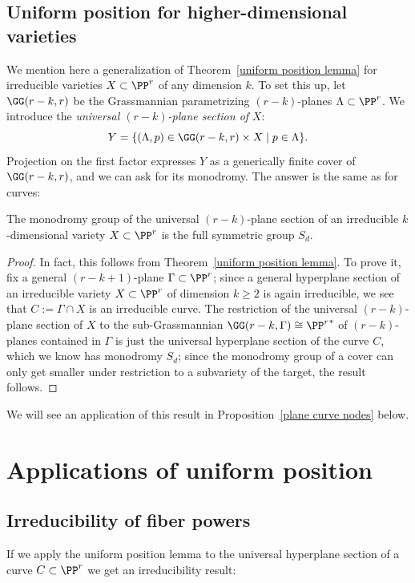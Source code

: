\subsection{Uniform position for higher-dimensional varieties}

We mention here a generalization of Theorem~\ref{uniform position lemma} for irreducible varieties $X \subset \PP^r$ of any dimension $k$. To set this up, let $\GG(r-k,r)$ be the Grassmannian parametrizing $(r-k)$-planes $\Lambda \subset \PP^r$. We introduce the \emph{universal $(r-k)$-plane section of} $X$:
$$
Y = \{ (\Lambda, p) \in \GG(r-k,r) \times X \mid p \in \Lambda \}.
$$
Projection on the first factor expresses $Y$ as a generically finite cover of $\GG(r-k,r)$, and we can ask for its monodromy. The answer is the same as for curves: 


\begin{theorem}\label{higher dim uniform position lemma}
The monodromy group of the universal $(r-k)$-plane section of an irreducible $k$-dimensional variety $X \subset \PP^r$ is the full symmetric group $S_d$.
\end{theorem}

\begin{proof}
In fact, this follows from Theorem~\ref{uniform position lemma}. To prove it, fix a general $(r-k+1)$-plane $\Gamma \subset \PP^r$; since a general hyperplane section of an irreducible variety $X \subset \PP^r$ of dimension $k \geq 2$ is again irreducible, we see that $C := \Gamma \cap X$ is an irreducible curve. The restriction of the universal $(r-k)$-plane section of $X$ to the sub-Grassmannian $\GG(r-k, \Gamma) \cong {\PP^r}^*$ of $(r-k)$-planes contained in $\Gamma$ is just the universal hyperplane section of the curve $C$, which we know has monodromy $S_d$; since the monodromy group of a cover can only get smaller under restriction to a subvariety of the target, the result follows.
\end{proof}

We will see an application of this result in Proposition~\ref{plane curve nodes} below.

 \section{Applications of uniform position}
\subsection{Irreducibility of fiber powers}
If we apply the uniform position lemma to the universal hyperplane section of a curve $C \subset \PP^r$ we get an irreducibility result:

